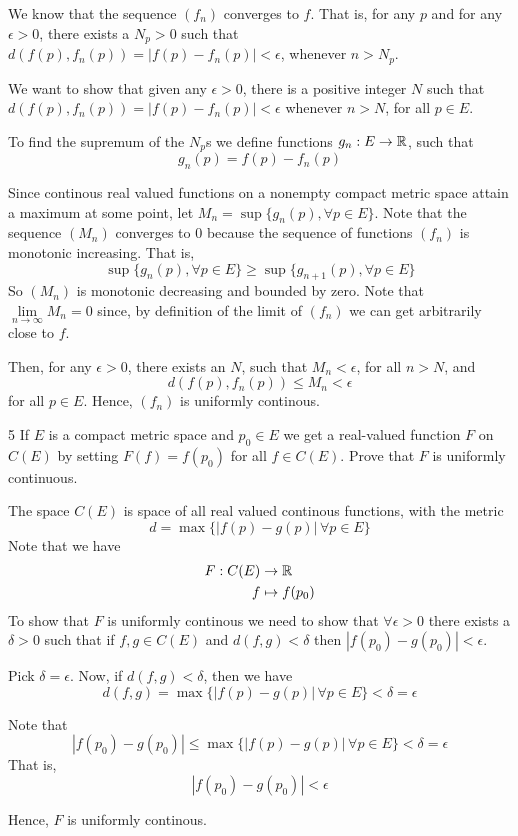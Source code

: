 \documentclass[12pt]{article}
\begin{document}
\begin{solution}
    \bbni

    We know that the sequence $(f_n)$ converges to $f$. That is, for any $p$ and for any $\epsilon >0$, there exists a $N_p >0$ such that $d(f(p), f_n(p)) = |f(p) - f_n(p)| < \epsilon$, whenever $n > N_p$. 

    We want to show that given any $\epsilon > 0$, there is a positive integer $N$ such that $d(f(p), f_n(p))  = |f(p) - f_n(p)|< \epsilon$ whenever $n > N$, for all $p \in E$. 

    To find the supremum of the $N_p$s we define functions  $g_n: E \to \mathbb R$, such that  \[g_n(p) = f(p) - f_n(p)\]
    
    Since continous real valued functions on a nonempty compact metric space attain a maximum at some point, let $M_n = \sup\{g_n(p), \forall p \in E\}$. 
    Note that the sequence $(M_n)$ converges to $0$ because the sequence of functions $(f_n)$ is monotonic increasing. That is, 
    \[\sup\{g_n(p), \forall p \in E\} \geq \sup\{g_{n+1}(p), \forall p \in E\}\]
    So $(M_n)$ is monotonic decreasing and bounded by zero. Note that $\underset{n\to \infty}{\lim}{M_n} =0$ since, by definition of the limit of $(f_n)$ we can get arbitrarily close to $f$. 

    Then, for any $\epsilon >0$, there exists an $N$, such that  $M_n < \epsilon$, for all $n>N$, and 
    \[d(f(p), f_n(p)) \leq M_n < \epsilon\]
    for all $p \in E$. Hence, $(f_n)$ is uniformly continous. 
\end{solution}

\newpage 

\begin{problem}{5}
    If $E$ is a compact metric space and $p_0 \in E$ we get a real-valued function $F$ on $C(E)$ by setting $F(f) = f (p_0)$ for all $f \in C(E)$. Prove that $F$ is uniformly continuous.
\end{problem}

\begin{solution}
    \bbni
    
    The space $C(E)$ is space of all real valued continous functions, with the metric \[d = \max \{|f (p) - g(p)| \,\forall p \in E\}\]
    Note that we have 
    \begin{align*}
        F: C(E) &\to \mathbb R \\ 
        f &\mapsto f(p_0) 
    \end{align*}
    To show that $F$ is uniformly continous we need to show that  $\forall \epsilon > 0$ there exists a $\delta >0$ such that if $f, g \in C(E)$ and $d(f, g) < \delta$ then $|f(p_0) - g(p_0)| < \epsilon$. 
    
    Pick $\delta = \epsilon$. Now, if $d(f, g) < \delta$, then we have 
    \[d(f, g) = \max \{|f (p) - g(p)| \,\forall p \in E\}  < \delta = \epsilon\] 

    Note that \[ |f(p_0) - g(p_0)| \leq \max \{|f (p) - g(p)| \,\forall p \in E\} < \delta = \epsilon\]
    That is, 
    \[ |f(p_0) - g(p_0)|  < \epsilon\]

    Hence, $F$ is uniformly continous. 
\end{solution}
\end{document}
